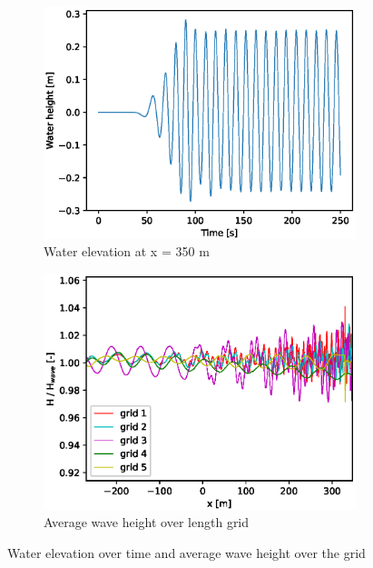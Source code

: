 \begin{figure}[H]
     \centering
     \begin{subfigure}[b]{0.49\textwidth}
         \centering
         \includegraphics[width=\textwidth]{figures/Validation/water_elevation_350m_eps.eps}
        \caption{Water elevation at x = 350 m}
        \label{fig:waterelevation350m}
     \end{subfigure}
     \hfill
     \begin{subfigure}[b]{0.49\textwidth}
         \centering
        \includegraphics[width = \linewidth]{figures/Validation/numerical_dissipation_eps.eps}
        \caption{Average wave height over length grid}
        \label{fig:averagewaveheight}
     \end{subfigure}
     \caption{Water elevation over time and average wave height over the grid}
\end{figure}


